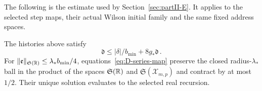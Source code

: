 \begin{samepage}
The following is the estimate used by Section~\ref{sec:partII-E}. It applies to the selected step maps, their actual Wilson initial family and the same fixed address spaces.
\begin{lemma}\label{lem:D-E1}
The histories above satisfy
\begin{equation*}
\mathfrak d\le |\delta|/b_{\min}+8g_*\mathfrak d\,.
\end{equation*}
For $\|\mathfrak e\|_{\mathfrak S(\mathbb{R})}\le\lambda_*b_{\min}/4$, equations~\eqref{eq:D-series-map} preserve the closed radius-$\lambda_*$ ball in the product of the spaces $\mathfrak S(\mathbb{R})$ and $\mathfrak S(\mathcal X_{m,p})$ and contract by at most $1/2$. Their unique solution evaluates to the selected real recursion.
\end{lemma}
\end{samepage}
